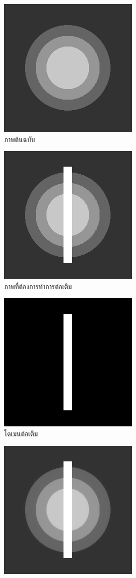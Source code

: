 \documentclass[hidelinks,a4paper,14pt]{article}
\numberwithin{equation}{section}							%
\begin{document}
{\begin{figure}[H]
	\centering
	\begin{subfigure}{0.3\linewidth}
		\centering
		\includegraphics[width=0.3\linewidth]{images/grayscale_inpaint/original.png}
		\caption{ภาพต้นฉบับ}
	\end{subfigure}
	\begin{subfigure}{0.3\linewidth}
		\centering
		\includegraphics[width=0.3\linewidth]{images/grayscale_inpaint/toinapint.png}
		\caption{ภาพที่ต้องการทำการต่อเติม}
	\end{subfigure}
	\begin{subfigure}{0.3\linewidth}
		\centering
		\includegraphics[width=0.3\linewidth]{images/grayscale_inpaint/inpaintdomain.png}
		\caption{โดเมนต่อเติม}
	\end{subfigure}
	\begin{subfigure}{0.3\linewidth}
		\centering
		\includegraphics[width=0.3\linewidth]{images/grayscale_inpaint/result_timemarch.png}

\end{subfigure}
\end{figure}}
\end{document}
